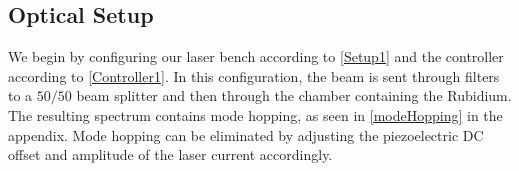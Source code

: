 \documentclass[12pt]{article}
\begin{document}
%	
%	
%
	
	
	\subsection{Optical Setup}
	We begin by configuring our laser bench according to \cref{Setup1} and the controller according to \cref{Controller1}. In this configuration, the beam is sent through filters to a $50/50$ beam splitter and then through the chamber containing the Rubidium. The resulting spectrum contains mode hopping, as seen in \cref{modeHopping} in the appendix.
	Mode hopping can be eliminated by adjusting the piezoelectric DC offset and amplitude of the laser current accordingly.
	
\end{document}
